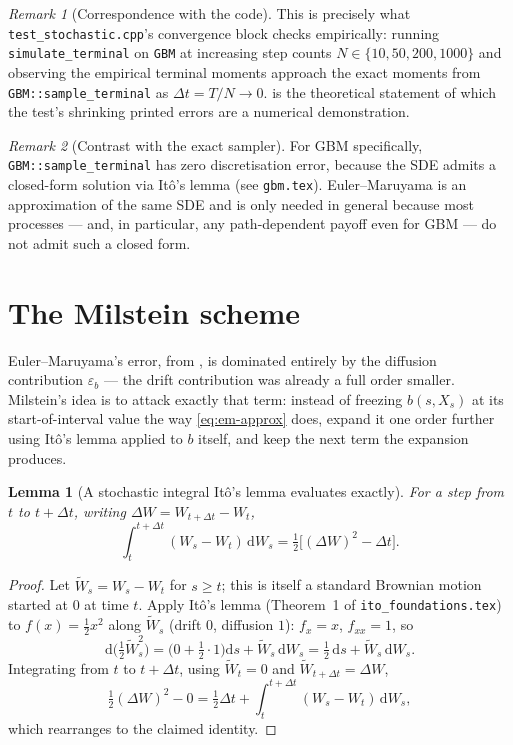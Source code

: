 \documentclass[11pt]{article}
\newcommand{\dd}{\mathrm{d}}
\newcommand{\diff}{b}
\theoremstyle{plain}
\newtheorem{lemma}{Lemma}
\theoremstyle{definition}
\theoremstyle{remark}
\newtheorem{remark}{Remark}
\begin{document}
\begin{remark}[Correspondence with the code]
This is precisely what \texttt{test\_stochastic.cpp}'s convergence
block checks empirically: running \texttt{simulate\_terminal} on
\texttt{GBM} at increasing step counts $N \in \{10,50,200,1000\}$
and observing the empirical terminal moments approach the exact
moments from \texttt{GBM::sample\_terminal} as $\Delta t = T/N \to 0$.
 is the theoretical statement of which the test's
shrinking printed errors are a numerical demonstration.
\end{remark}

\begin{remark}[Contrast with the exact sampler]
For GBM specifically, \texttt{GBM::sample\_terminal} has zero
discretisation error, because the SDE admits a closed-form solution
via It\^o's lemma (see \texttt{gbm.tex}). Euler--Maruyama is an
approximation of the same SDE and is only needed in general
because most processes --- and, in particular, any path-dependent
payoff even for GBM --- do not admit such a closed form.
\end{remark}

\section{The Milstein scheme}

Euler--Maruyama's error, from , is dominated
entirely by the diffusion contribution $\varepsilon_{\diff}$ --- the
drift contribution was already a full order smaller. Milstein's idea
is to attack exactly that term: instead of freezing $\diff(s,X_s)$ at
its start-of-interval value the way \eqref{eq:em-approx} does, expand
it one order further using It\^o's lemma applied to $\diff$ itself,
and keep the next term the expansion produces.

\begin{lemma}[A stochastic integral It\^o's lemma evaluates exactly]\label{lem:wdw}
For a step from $t$ to $t+\Delta t$, writing $\Delta W=W_{t+\Delta
t}-W_t$,
\[
   \int_t^{t+\Delta t} (W_s-W_t)\,\dd W_s = \tfrac12\big[(\Delta W)^2-\Delta t\big].
\]
\end{lemma}

\begin{proof}
Let $\widetilde W_s = W_s-W_t$ for $s\ge t$; this is itself a standard
Brownian motion started at $0$ at time $t$. Apply It\^o's lemma
(Theorem~1 of \texttt{ito\_foundations.tex}) to $f(x)=\tfrac12 x^2$
along $\widetilde W_s$ (drift $0$, diffusion $1$): $f_x=x$, $f_{xx}=1$,
so
\[
   \dd\big(\tfrac12\widetilde W_s^2\big)
     = \Big(0+\tfrac12\cdot1\Big)\dd s + \widetilde W_s\,\dd W_s
     = \tfrac12\,\dd s + \widetilde W_s\,\dd W_s.
\]
Integrating from $t$ to $t+\Delta t$, using $\widetilde W_t=0$ and
$\widetilde W_{t+\Delta t}=\Delta W$,
\[
   \tfrac12(\Delta W)^2 - 0 = \tfrac12\Delta t + \int_t^{t+\Delta t}(W_s-W_t)\,\dd W_s,
\]
which rearranges to the claimed identity.
\end{proof}
\end{document}
